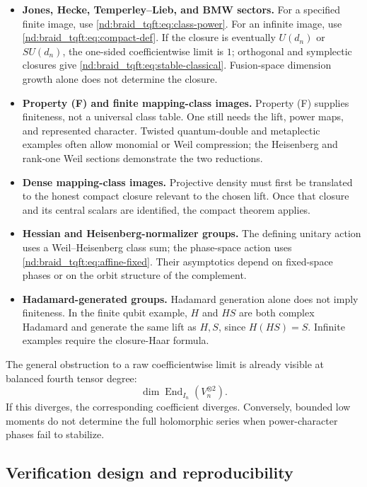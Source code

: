 \documentclass[10pt]{article}
\begin{document}
\begin{itemize}
\item \textbf{Jones, Hecke, Temperley--Lieb, and BMW sectors.}  For a specified
finite image, use \eqref{nd:braid_tqft:eq:class-power}.  For an infinite image, use
\eqref{nd:braid_tqft:eq:compact-def}.  If the closure is eventually $U(d_n)$ or $SU(d_n)$,
the one-sided coefficientwise limit is $1$; orthogonal and symplectic closures
give \eqref{nd:braid_tqft:eq:stable-classical}.  Fusion-space dimension growth alone does
not determine the closure.
\item \textbf{Property (F) and finite mapping-class images.}  Property (F)
supplies finiteness, not a universal class table.  One still needs the lift,
power maps, and represented character.  Twisted quantum-double and
metaplectic examples often allow monomial or Weil compression; the
Heisenberg and rank-one Weil sections demonstrate the two reductions.
\item \textbf{Dense mapping-class images.}  Projective density must first be
translated to the honest compact closure relevant to the chosen lift.  Once
that closure and its central scalars are identified, the compact theorem
applies.
\item \textbf{Hessian and Heisenberg-normalizer groups.}  The defining
unitary action uses a Weil--Heisenberg class sum; the phase-space action uses
\eqref{nd:braid_tqft:eq:affine-fixed}.  Their asymptotics depend on fixed-space phases or on
the orbit structure of the complement.
\item \textbf{Hadamard-generated groups.}  Hadamard generation alone does not
imply finiteness.  In the finite qubit example, $H$ and $HS$ are both complex
Hadamard and generate the same lift as $H,S$, since $H(HS)=S$.  Infinite
examples require the closure-Haar formula.
\end{itemize}

The general obstruction to a raw coefficientwise limit is already visible at
balanced fourth tensor degree:
\[
\dim\operatorname{End}_{I_n}(V_n^{\otimes2}).
\]
If this diverges, the corresponding coefficient diverges.  Conversely,
bounded low moments do not determine the full holomorphic series when
power-character phases fail to stabilize.

\subsection{Verification design and reproducibility}
\end{document}
